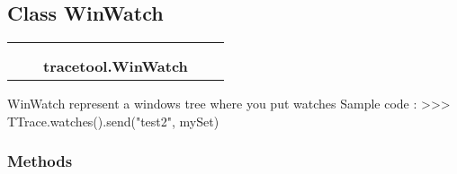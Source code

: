 

\subsection{Class WinWatch}

    \label{tracetool:WinWatch}
\begin{tabular}{cccccc}
\multicolumn{2}{r}{\settowidth{\BCL}{object}\multirow{2}{\BCL}{object}}
&&
  \\\cline{3-3}
  &&\multicolumn{1}{c|}{}
&&
  \\
&&\multicolumn{2}{l}{\textbf{tracetool.WinWatch}}
\end{tabular}

WinWatch represent a windows tree where you put watches Sample code : 
{\textgreater}{\textgreater}{\textgreater} TTrace.watches().send("test2", 
mySet)



  \subsubsection{Methods}

    \vspace{0.5ex}

